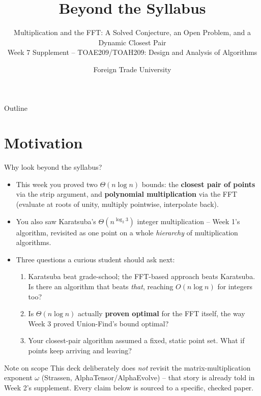 \documentclass[11pt,aspectratio=169]{beamer}
\title{Beyond the Syllabus}
\subtitle{Multiplication and the FFT: A Solved Conjecture, an Open Problem, and a Dynamic
Closest Pair\\
\small Week 7 Supplement -- TOAE209/TOAH209: Design and Analysis of Algorithms}
\author{Foreign Trade University}
\date{}
\begin{document}
\begin{frame}
  \titlepage
\end{frame}

\begin{frame}{Outline}
  \tableofcontents
\end{frame}

\section{Motivation}

\begin{frame}{Why look beyond the syllabus?}
  \footnotesize
  \begin{itemize}
    \item This week you proved two $\Theta(n\log n)$ bounds: the \textbf{closest pair of
    points} via the strip argument, and \textbf{polynomial multiplication} via the FFT
    (evaluate at roots of unity, multiply pointwise, interpolate back).
    \item You also saw Karatsuba's $\Theta(n^{\log_2 3})$ integer multiplication --
    Week 1's algorithm, revisited as one point on a whole \emph{hierarchy} of
    multiplication algorithms.
    \item Three questions a curious student should ask next:
    \begin{enumerate}
      \item Karatsuba beat grade-school; the FFT-based approach beats Karatsuba. Is there
      an algorithm that beats \emph{that}, reaching $O(n\log n)$ for integers too?
      \item Is $\Theta(n\log n)$ actually \textbf{proven optimal} for the FFT itself, the
      way Week 3 proved Union-Find's bound optimal?
      \item Your closest-pair algorithm assumed a fixed, static point set. What if points
      keep arriving and leaving?
    \end{enumerate}
  \end{itemize}
  \begin{alertblock}{Note on scope}
    This deck deliberately does \emph{not} revisit the matrix-multiplication exponent
    $\omega$ (Strassen, AlphaTensor/AlphaEvolve) -- that story is already told in Week 2's
    supplement. Every claim below is sourced to a specific, checked paper.
  \end{alertblock}
\end{frame}
\end{document}
